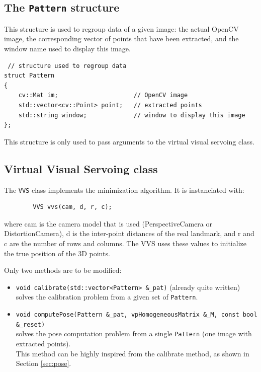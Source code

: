 \documentclass{ecnreport}
\begin{document}
 \subsection{The \texttt{Pattern} structure}
 
 This structure is used to regroup data of a given image: the actual OpenCV image, the corresponding vector of points that have been extracted, and the window name used to display this image.
 
  \begin{center}\cppstyle
\begin{lstlisting}
 // structure used to regroup data
struct Pattern
{
    cv::Mat im;                     // OpenCV image
    std::vector<cv::Point> point;   // extracted points
    std::string window;             // window to display this image
};\end{lstlisting}
\end{center}This structure is only used to pass arguments to the virtual visual servoing class.


 \subsection{Virtual Visual Servoing class}
 
 The \texttt{VVS} class implements the minimization algorithm. It is instanciated with:
 \begin{center}\cppstyle
\begin{lstlisting}
        VVS vvs(cam, d, r, c);
\end{lstlisting}
\end{center}where cam is the camera model that is used (PerspectiveCamera or DistortionCamera), d is the inter-point distances of the real landmark, and r and c are the number of rows and columns. The VVS uses these values to initialize the true position of the 3D points.

Only two methods are to be modified:
\begin{itemize}
    \item \texttt{void calibrate(std::vector<Pattern> \&\_pat)} (already quite written)\\ solves the calibration problem from a given set of \texttt{Pattern}. 
    \item \texttt{void computePose(Pattern \&\_pat, vpHomogeneousMatrix \&\_M, const bool \&\_reset)} \\ 
    solves the pose computation problem from a single \texttt{Pattern} (one image with extracted points).\\ This method can be highly inspired from the calibrate method, as shown in Section \ref{sec:pose}.
\end{itemize}
\end{document}
